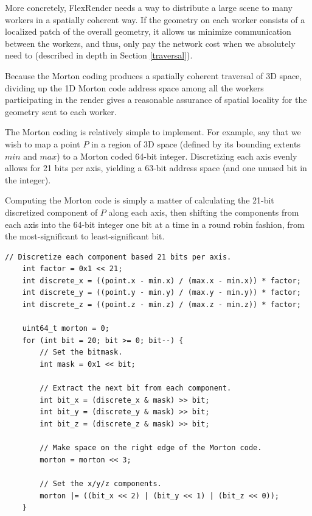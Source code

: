 \documentclass[12pt]{ucthesis}
\begin{document}
More concretely, FlexRender needs a way to distribute a large scene to many
workers in a spatially coherent way. If the geometry on each worker consists
of a localized patch of the overall geometry, it allows us minimize communication
between the workers, and thus, only pay the network cost when we absolutely need
to (described in depth in Section \ref{traversal}).

Because the Morton coding produces a spatially coherent traversal of 3D space,
dividing up the 1D Morton code address space among all the workers participating
in the render gives a reasonable assurance of spatial locality for the geometry
sent to each worker.

The Morton coding is relatively simple to implement. For example, say that
we wish to map a point $P$ in a region of 3D space (defined by its bounding extents
$min$ and $max$) to a Morton coded 64-bit integer. Discretizing each axis evenly
allows for 21 bits per axis, yielding a 63-bit address space (and one unused bit
in the integer).

Computing the Morton code is simply a matter of calculating the 21-bit discretized
component of $P$ along each axis, then shifting the components from each axis
into the 64-bit integer one bit at a time in a round robin fashion, from the
most-significant to least-significant bit.

\begin{lstlisting}[caption=Example of computing the Morton code.,label=mortoncode]
    // Discretize each component based 21 bits per axis.
    int factor = 0x1 << 21;
    int discrete_x = ((point.x - min.x) / (max.x - min.x)) * factor;
    int discrete_y = ((point.y - min.y) / (max.y - min.y)) * factor;
    int discrete_z = ((point.z - min.z) / (max.z - min.z)) * factor;

    uint64_t morton = 0;
    for (int bit = 20; bit >= 0; bit--) {
        // Set the bitmask.
        int mask = 0x1 << bit;

        // Extract the next bit from each component.
        int bit_x = (discrete_x & mask) >> bit;
        int bit_y = (discrete_y & mask) >> bit;
        int bit_z = (discrete_z & mask) >> bit;

        // Make space on the right edge of the Morton code.
        morton = morton << 3;

        // Set the x/y/z components.
        morton |= ((bit_x << 2) | (bit_y << 1) | (bit_z << 0));
    }
\end{lstlisting}
\end{document}
